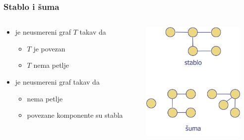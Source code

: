 \documentclass[compress,aspectratio=169]{beamer}
\begin{document}
\begin{frame}[fragile]
  \frametitle{Stablo i šuma}
  \begin{columns}
    \begin{column}[t]{6cm}
      \begin{itemize}
        \item {} je neusmereni graf $T$ takav da
        \begin{itemize}
          \item $T$ je povezan
          \item $T$ nema petlje
        \end{itemize}
        \item {} je neusmereni graf takav da
        \begin{itemize}
          \item nema petlje
          \item povezane komponente su stabla
        \end{itemize}
      \end{itemize}
    \end{column}
    \begin{column}[t]{6cm}
      \begin{center}
        \includegraphics[width=5cm]{asp-14-pic16.png}
      \end{center}
    \end{column}
  \end{columns}
\end{frame}
\end{document}
